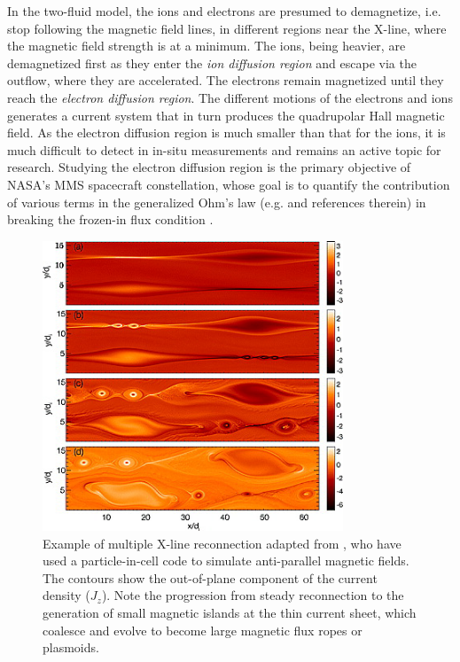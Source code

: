 In the two-fluid model, the ions and electrons are presumed to demagnetize, i.e. stop following the magnetic field lines, in different regions near the X-line, where the magnetic field strength is at a minimum. The ions, being heavier, are demagnetized first as they enter the \emph{ion diffusion region} and escape via the outflow, where they are accelerated. The electrons remain magnetized until they reach the \emph{electron diffusion region}. The different motions of the electrons and ions generates a current system that in turn produces the quadrupolar Hall magnetic field. As the electron diffusion region is much smaller than that for the ions, it is much difficult to detect in in-situ measurements and remains an active topic for research. Studying the electron diffusion region is the primary objective of NASA's MMS spacecraft constellation, whose goal is to quantify the contribution of various terms in the generalized Ohm's law (e.g.  and references therein) in breaking the frozen-in flux condition \cite{Burch2016MagnetosphericObjectives}.  

\begin{figure}
    \centering
    \includegraphics[width=0.8\textwidth]{images1/reconnection-multiplexline-example.png}
    \caption{Example of multiple X-line reconnection adapted from \protect{}, who have used a particle-in-cell code to simulate anti-parallel magnetic fields. The contours show the out-of-plane component of the current density ($J_z$). Note the progression from steady reconnection to the generation of small magnetic islands at the thin current sheet, which coalesce and evolve to become large magnetic flux ropes or plasmoids.}
    \label{fig:example-multiplexline-reconnection}
\end{figure}

